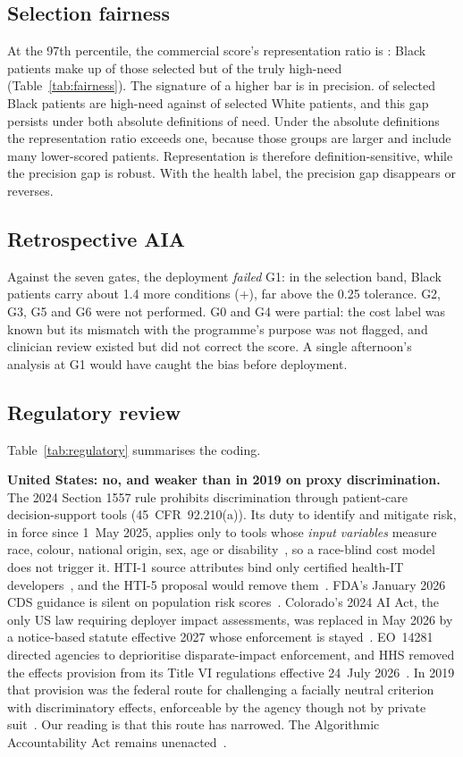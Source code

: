 \documentclass[conference]{IEEEtran}
\begin{document}
\subsection{Selection fairness}
At the 97th percentile, the commercial score's representation ratio is \RepRatio: Black patients make up \LabCommercial{} of those selected but \NeedShare{} of the truly high-need (Table~\ref{tab:fairness}). The signature of a higher bar is in precision. \PpvB{} of selected Black patients are high-need against \PpvW{} of selected White patients, and this gap persists under both absolute definitions of need. Under the absolute definitions the representation ratio exceeds one, because those groups are larger and include many lower-scored patients. Representation is therefore definition-sensitive, while the precision gap is robust. With the health label, the precision gap disappears or reverses.



\subsection{Retrospective AIA}
Against the seven gates, the deployment \emph{failed} G1: in the selection band, Black patients carry about 1.4 more conditions (+\TopCondRel), far above the 0.25 tolerance. G2, G3, G5 and G6 were not performed. G0 and G4 were partial: the cost label was known but its mismatch with the programme's purpose was not flagged, and clinician review existed but did not correct the score. A single afternoon's analysis at G1 would have caught the bias before deployment.

\subsection{Regulatory review}
Table~\ref{tab:regulatory} summarises the coding.

\textbf{United States: no, and weaker than in 2019 on proxy discrimination.} The 2024 Section 1557 rule prohibits discrimination through patient-care decision-support tools (45~CFR~92.210(a)). Its duty to identify and mitigate risk, in force since 1~May 2025, applies only to tools whose \emph{input variables} measure race, colour, national origin, sex, age or disability~\cite{hhs1557,ocr2025}, so a race-blind cost model does not trigger it. HTI-1 source attributes bind only certified health-IT developers~\cite{hti1}, and the HTI-5 proposal would remove them~\cite{hti5}. FDA's January 2026 CDS guidance is silent on population risk scores~\cite{fda_cds}. Colorado's 2024 AI Act, the only US law requiring deployer impact assessments, was replaced in May 2026 by a notice-based statute effective 2027 whose enforcement is stayed~\cite{colorado}. EO~14281 directed agencies to deprioritise disparate-impact enforcement, and HHS removed the effects provision from its Title VI regulations effective 24~July 2026~\cite{eo14281,hhs_tvi2026}. In 2019 that provision was the federal route for challenging a facially neutral criterion with discriminatory effects, enforceable by the agency though not by private suit~\cite{sandoval2001}. Our reading is that this route has narrowed. The Algorithmic Accountability Act remains unenacted~\cite{aaa2025}.
\end{document}
